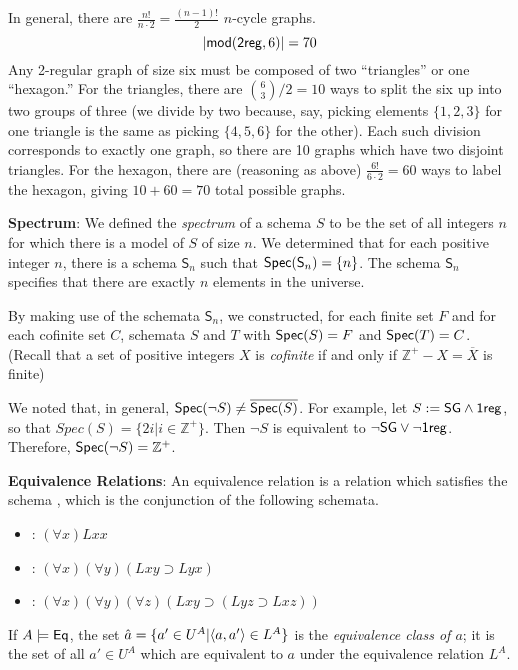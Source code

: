 \begin{mdframed}[linewidth=1]
In general, there are $\frac{n!}{n\cdot 2} = \frac{(n-1)!}{2}$ $n$-cycle graphs. 
\[
    |\mbox{$\mathsf{mod}(\mbox{$\mathsf{2reg}$},6)$}| = 70
\] 
Any 2-regular graph of size six must be composed of two ``triangles'' or one ``hexagon.'' For the triangles, there are $\binom{6}{3}/2 = 10$ ways to split the six up into two groups of three (we divide by two because, say, picking elements $\{1, 2, 3\}$ for one triangle is the same as picking $\{4, 5, 6\}$ for the other). Each such division corresponds to exactly one graph, so there are 10 graphs which have two disjoint triangles. For the hexagon, there are (reasoning as above) $\frac{6!}{6 \cdot 2} = 60$ ways to label the hexagon, giving $10 + 60 = 70$ total possible graphs. 

\textbf{Spectrum}: We defined the \emph{spectrum} of a schema $S$ to be the set of all integers $n$ for which there is a model of $S$ of size $n$. We determined that for each positive integer $n$, there is a schema $\mathsf{S}_n$ such that $\mbox{$\mathsf{Spec}(\mathsf{S}_n)$} = \{n\}$. The schema $\mathsf{S}_n$ specifies that there are exactly $n$ elements in the universe.

By making use of the schemata $\mathsf{S}_n$, we constructed, for each finite set $F$ and for each cofinite set $C$, schemata $S$ and $T$ with $\mbox{$\mathsf{Spec}(S)$}=F$ and $\mbox{$\mathsf{Spec}(T)$}=C$. (Recall that a set of positive integers $X$ is \emph{cofinite} if and only if $\mathbb{Z}^+ - X = \overline{X}$ is finite)



We noted that, in general, $\mbox{$\mathsf{Spec}(\lnot S)$} \neq \overline{\mbox{$\mathsf{Spec}(S)$}}$. For example, let $S := \mbox{$\mathsf{SG}$} \land \mbox{$\mathsf{1reg}$}$, so that $Spec(S) = \{2i | i \in \mathbb{Z}^+\}$. Then $\lnot S$ is equivalent to $\lnot \mbox{$\mathsf{SG}$} \vee \lnot \mbox{$\mathsf{1reg}$}$. Therefore, $\mbox{$\mathsf{Spec}(\lnot S)$} = \mathbb{Z}^+$. 

\textbf{Equivalence Relations}: An equivalence relation is a relation which satisfies the schema \eqr, which is the conjunction of the following schemata.
\begin{itemize}
\item
{}: $(\forall x)Lxx$
\item
\sym: $(\forall x)(\forall y)(Lxy\supset Lyx)$
\item
\trans: $(\forall x)(\forall y)(\forall z)(Lxy\supset(Lyz\supset Lxz))$
\end{itemize}
If $A\models\mbox{$\mathsf{Eq}$}$, the set $\hat{a} = \{a' \in U^A | \mbox{$\langle a,a' \rangle$}\in L^A\}$ is the \emph{equivalence class of $a$}; it is the set of all $a' \in U^A$ which are equivalent to $a$ under the equivalence relation $L^A$. 


\end{mdframed}
